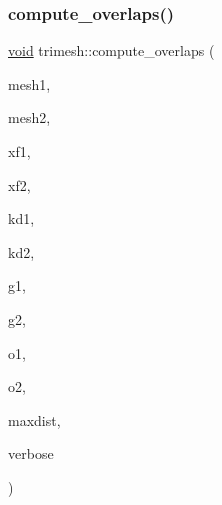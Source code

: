 \mbox{\label{namespacetrimesh_aa9254702bebad4e4f5fc958df4b30916}} 
\subsubsection{\texorpdfstring{compute\+\_\+overlaps()}{compute\_overlaps()}\hspace{0.1cm}{\footnotesize\ttfamily [1/2]}}
{\footnotesize\ttfamily \hyperlink{namespacetrimesh_a784ddfd979e1c579bda795a8edfc3f43}{void} trimesh\+::compute\+\_\+overlaps (\begin{DoxyParamCaption}\item[{\hyperlink{classtrimesh_1_1TriMesh}{Tri\+Mesh} $\ast$}]{mesh1,  }\item[{\hyperlink{classtrimesh_1_1TriMesh}{Tri\+Mesh} $\ast$}]{mesh2,  }\item[{const \hyperlink{namespacetrimesh_ad504958f2f56e393991b848986a8459f}{xform} \&}]{xf1,  }\item[{const \hyperlink{namespacetrimesh_ad504958f2f56e393991b848986a8459f}{xform} \&}]{xf2,  }\item[{const \hyperlink{classtrimesh_1_1KDtree}{K\+Dtree} $\ast$}]{kd1,  }\item[{const \hyperlink{classtrimesh_1_1KDtree}{K\+Dtree} $\ast$}]{kd2,  }\item[{const Grid $\ast$}]{g1,  }\item[{const Grid $\ast$}]{g2,  }\item[{\+::std\+::vector$<$ float $>$ \&}]{o1,  }\item[{\+::std\+::vector$<$ float $>$ \&}]{o2,  }\item[{float \&}]{maxdist,  }\item[{int}]{verbose }\end{DoxyParamCaption})}

\mbox{\label{namespacetrimesh_a86f331623ebf0f0a682502e20e436f2b}} 
